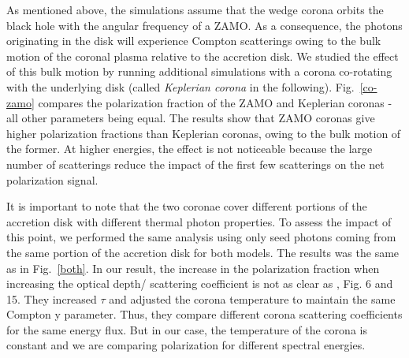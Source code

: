 \documentclass[manuscript]{aastex}
\begin{document}
As mentioned above, the simulations assume that the wedge corona orbits the black hole with the angular frequency of a ZAMO. As a consequence, the photons originating in the disk will experience Compton scatterings owing to the bulk motion of the coronal plasma relative to the accretion disk. We studied the effect of this bulk motion by running additional simulations with a corona co-rotating with the underlying disk (called {\it Keplerian corona} in the following). Fig.~\ref{co-zamo} compares the polarization fraction of the ZAMO and Keplerian coronas - all other parameters being equal. The results show that ZAMO coronas give higher polarization fractions than Keplerian coronas, owing to the bulk motion of the former. At higher energies, the effect is not noticeable because the large number of scatterings reduce the impact of the first few scatterings on the net polarization signal.

It is important to note that the two coronae cover different portions of the accretion disk with different thermal photon properties. To assess the impact of this point, we performed the same analysis using only seed photons coming from the same portion of the accretion disk for both models. The results was the same as in Fig.~\ref{both}.
In our result, the increase in the polarization fraction when increasing the optical depth/ scattering coefficient is not as clear as \citet{sch10}, Fig. 6 and 15. They increased $\tau$ and adjusted the corona temperature to maintain the same Compton y parameter. Thus, they compare different corona scattering coefficients  for the same energy flux. But in our case, the temperature of the corona is constant and we are comparing polarization for different spectral energies.
%
\end{document}
